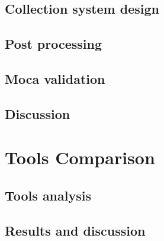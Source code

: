 \subsection{Collection system design}

\subsection{Post processing}

\subsection{Moca validation}

\subsection{Discussion}

\section{Tools Comparison}

\subsection{Tools analysis}

\subsection{Results and discussion}


